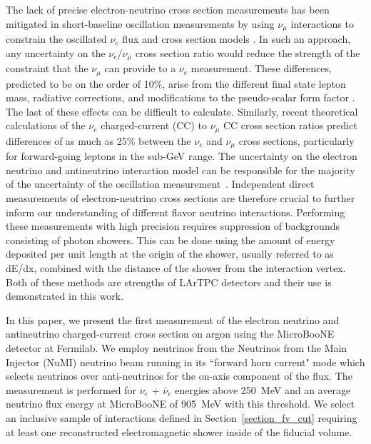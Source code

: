 \documentclass[%
 reprint,
 twocolumn,
superscriptaddress,
showpacs,preprintnumbers,
 amsmath,amssymb,
 aps,
prd,
longbibliography
]{revtex4-1}
\begin{document}
The lack of precise electron-neutrino cross section measurements has been mitigated in short-baseline oscillation measurements by using $\nu_{\mu}$ interactions to constrain the oscillated $\nu_{e}$ flux and cross section models \cite{PhysRevD.79.072002,miniboone_lee}. In such an approach, any uncertainty on the $\nu_{e}$/$\nu_{\mu}$ cross section ratio would reduce the strength of the constraint that the $\nu_{\mu}$ can provide to a $\nu_{e}$ measurement. These differences, predicted to be on the order of 10\%, arise from the different final state lepton mass, radiative corrections, and modifications to the pseudo-scalar form factor \cite{Day:2012gb}. The last of these effects can be difficult to calculate. Similarly, recent theoretical calculations of the $\nu_e$ charged-current (CC) to $\nu_{\mu}$ CC cross section ratios \cite{Nikolakopoulos:2019qcr} predict differences of as much as 25\% between the $\nu_{e}$ and $\nu_{\mu}$ cross sections, particularly for forward-going leptons in the sub-GeV range. The uncertainty on the electron neutrino and antineutrino interaction model can be responsible for the majority of the uncertainty of the oscillation measurement~\cite{Abe:2019vii}. 
Independent direct measurements of electron-neutrino cross sections are therefore crucial to further inform our understanding of different flavor neutrino interactions. Performing these measurements with high precision requires suppression of backgrounds consisting of photon showers. This can be done using the amount of energy deposited per unit length at the origin of the shower, usually referred to as dE/dx, combined with the distance of the shower from the interaction vertex. Both of these methods are strengths of LArTPC detectors and their use is demonstrated in this work.    

In this paper, we present the first measurement of the electron neutrino and antineutrino charged-current cross section on argon using the MicroBooNE \cite{microboone_experiment} detector at Fermilab.
We employ neutrinos from the Neutrinos from the Main Injector (NuMI) neutrino beam \cite{numibeam} running in its ``forward horn current" mode which selects neutrinos over anti-neutrinos for the on-axis component of the flux. The measurement is performed for $\nu_e$ + $\bar{\nu}_e$ energies above 250~MeV and an average neutrino flux energy at MicroBooNE of 905~MeV with this threshold. We select an inclusive sample of interactions defined in Section~\ref{section_fv_cut} requiring at least one reconstructed electromagnetic shower inside of the fiducial volume. 
\end{document}
